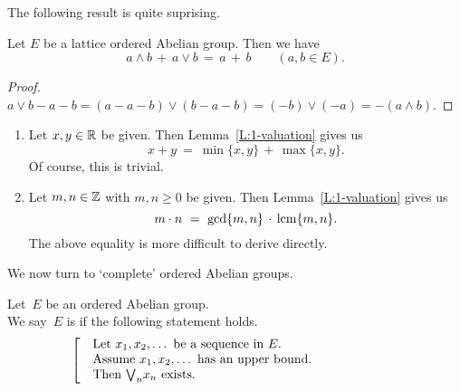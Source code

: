 \documentclass[main.tex]{subfiles}
\begin{document}
\noindent
The following result is quite suprising.
%
%
\begin{lem}
\label{L:1-valuation}
Let $E$ be a lattice ordered Abelian group.
Then we have 
\begin{equation*}
a\wedge b  \,+\, a\vee b \,=\, a\,+\,b \qquad(a,b\in E).
\end{equation*}
\end{lem}
\begin{proof}
$a\vee b - a - b
= (a - a - b) \vee (b - a - b)
= (-b)\vee(-a) = -(a\wedge b)$.
\end{proof}
\begin{exs}
\begin{enumerate}
\item
Let $x,y\in \mathbb{R}$ be given.
Then Lemma~\ref{L:1-valuation}
gives us
\begin{equation*}
x+y\ =\ \min\{x,y\} \,+\, \max\{x,y\}.
\end{equation*}
Of course, this is trivial.

\item
Let $m,n\in \mathbb{Z}$ with $m,n\geq 0$ be given.
Then Lemma~\ref{L:1-valuation}
gives us
\begin{equation*}
m\cdot n \ =\ \gcd\{m,n\} \,\cdot\,\operatorname{lcm}\{m,n\}.
\end{equation*}
The above equality is more difficult to derive directly.
\end{enumerate}
\end{exs}
%
%
\noindent
We now turn to `complete' ordered Abelian groups.
\begin{dfn}
\label{D:sdc}
Let~$E$ be an ordered Abelian group.\\
We say~$E$ is 
if the following statement holds.
\begin{equation*}
\left[\quad
\begin{minipage}{.7\columnwidth}
Let $x_1,x_2,\dotsc$ be a sequence in~$E$.\\
Assume $x_1,x_2,\dotsc$ has an upper bound.\\
Then $\bv_n x_n$ exists.
\end{minipage}
\right.
\end{equation*}
\end{dfn}
%
%
\end{document}
